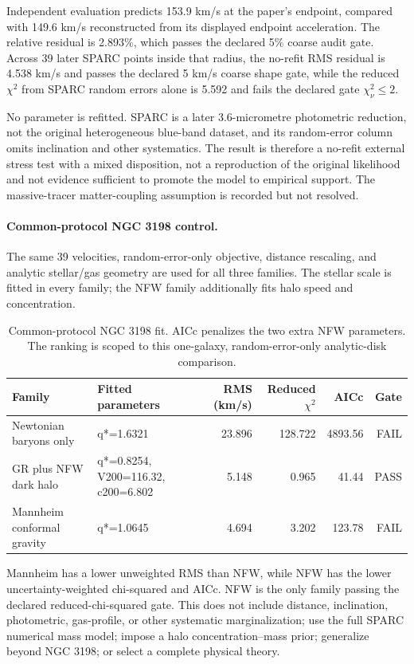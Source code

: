 Independent evaluation predicts 153.9 km/s at the paper's endpoint, compared with 149.6 km/s reconstructed from its displayed endpoint acceleration.  The relative residual is 2.893\%, which passes the declared 5\% coarse audit gate.  Across 39 later SPARC points inside that radius, the no-refit RMS residual is 4.538 km/s and passes the declared 5 km/s coarse shape gate, while the reduced $\chi^2$ from SPARC random errors alone is 5.592 and fails the declared gate $\chi^2_\nu\leq2$.

No parameter is refitted.  SPARC is a later 3.6-micrometre photometric reduction, not the original heterogeneous blue-band dataset, and its random-error column omits inclination and other systematics.  The result is therefore a no-refit external stress test with a mixed disposition, not a reproduction of the original likelihood and not evidence sufficient to promote the model to empirical support.  The massive-tracer matter-coupling assumption is recorded but not resolved.

\paragraph{Common-protocol NGC 3198 control.}
The same 39 velocities, random-error-only objective, distance rescaling, and analytic stellar/gas geometry are used for all three families.  The stellar scale is fitted in every family; the NFW family additionally fits halo speed and concentration.

\begin{table}[htbp]
\centering
\scriptsize
\begin{tabularx}{\textwidth}{@{}Yp{0.25\textwidth}rrrr@{}}
\toprule
Family & Fitted parameters & RMS (km/s) & Reduced $\chi^2$ & AICc & Gate \\
\midrule
Newtonian baryons only & q*=1.6321 & 23.896 & 128.722 & 4893.56 & FAIL \\
GR plus NFW dark halo & q*=0.8254, V200=116.32, c200=6.802 & 5.148 & 0.965 & 41.44 & PASS \\
Mannheim conformal gravity & q*=1.0645 & 4.694 & 3.202 & 123.78 & FAIL \\
\bottomrule
\end{tabularx}
\caption{Common-protocol NGC 3198 fit.  AICc penalizes the two extra NFW parameters.  The ranking is scoped to this one-galaxy, random-error-only analytic-disk comparison.}
\label{tab:ngc3198-common-fit}
\end{table}

Mannheim has a lower unweighted RMS than NFW, while NFW has the lower uncertainty-weighted chi-squared and AICc.  NFW is the only family passing the declared reduced-chi-squared gate.  This does not include distance, inclination, photometric, gas-profile, or other systematic marginalization; use the full SPARC numerical mass model; impose a halo concentration--mass prior; generalize beyond NGC 3198; or select a complete physical theory.

